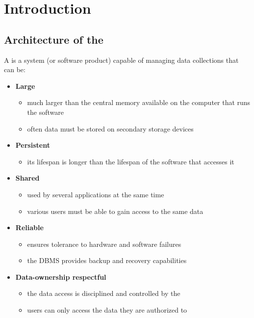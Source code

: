 \documentclass[english]{article}
\begin{document}

\section{Introduction}

\subsection{Architecture of the \DBMS}

A \textbf{\DBMS} is a system (or software product) capable of managing data collections that can be:

\begin{itemize}
  \item \textbf{Large}
        \begin{itemize}[label=\(\rightarrow\)]
          \item much larger than the central memory available on the computer that runs the software
          \item often data must be stored on secondary storage devices
        \end{itemize}
  \item \textbf{Persistent}
        \begin{itemize}[label=\(\rightarrow\)]
          \item its lifespan is longer than the lifespan of the software that accesses it
        \end{itemize}
  \item \textbf{Shared}
        \begin{itemize}[label=\(\rightarrow\)]
          \item used by several applications at the same time
          \item various users must be able to gain access to the same data
        \end{itemize}
  \item \textbf{Reliable}
        \begin{itemize}[label=\(\rightarrow\)]
          \item ensures tolerance to hardware and software failures
          \item the DBMS provides backup and recovery capabilities
        \end{itemize}
  \item \textbf{Data-ownership respectful}
        \begin{itemize}[label=\(\rightarrow\)]
          \item the data access is disciplined and controlled by the \DBMS
          \item users can only access the data they are authorized to
        \end{itemize}
\end{itemize}
\end{document}
